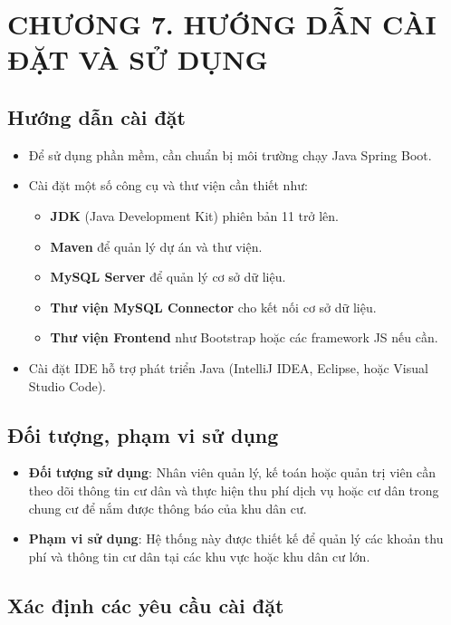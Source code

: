 \documentclass{article}
\begin{document}
\newpage

\section*{CHƯƠNG 7. HƯỚNG DẪN CÀI ĐẶT VÀ SỬ DỤNG}
\setcounter{section}{7}
\setcounter{subsection}{0}
\subsection{Hướng dẫn cài đặt}
\begin{itemize}
    \item Để sử dụng phần mềm, cần chuẩn bị môi trường chạy Java Spring Boot.
    \item Cài đặt một số công cụ và thư viện cần thiết như:
    \begin{itemize}
        \item \textbf{JDK} (Java Development Kit) phiên bản 11 trở lên.
        \item \textbf{Maven} để quản lý dự án và thư viện.
        \item \textbf{MySQL Server} để quản lý cơ sở dữ liệu.
        \item \textbf{Thư viện MySQL Connector} cho kết nối cơ sở dữ liệu.
        \item \textbf{Thư viện Frontend} như Bootstrap hoặc các framework JS nếu cần.
    \end{itemize}
    \item Cài đặt IDE hỗ trợ phát triển Java (IntelliJ IDEA, Eclipse, hoặc Visual Studio Code).
\end{itemize}
\subsection{Đối tượng, phạm vi sử dụng}
\begin{itemize} 
    \item \textbf{Đối tượng sử dụng}: Nhân viên quản lý, kế toán hoặc quản trị viên cần theo dõi thông tin cư dân và thực hiện thu phí dịch vụ hoặc cư dân trong chung cư để nắm được thông báo của khu dân cư.
    \item \textbf{Phạm vi sử dụng}: Hệ thống này được thiết kế để quản lý các khoản thu phí và thông tin cư dân tại các khu vực hoặc khu dân cư lớn. 
\end{itemize}
\subsection{Xác định các yêu cầu cài đặt}
\end{document}
